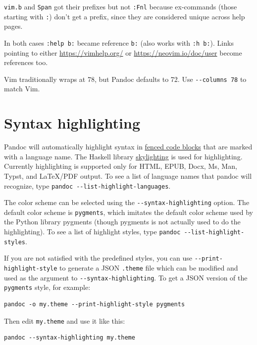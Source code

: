 \documentclass[
]{article}
\begin{document}
\texttt{vim.b} and \texttt{Span} got their prefixes but not
\texttt{:Fnl} because ex-commands (those starting with \texttt{:}) don't
get a prefix, since they are considered unique across help pages.

In both cases \texttt{:help\ b:} became reference
\texttt{\textbar{}b:\textbar{}} (also works with \texttt{:h\ b:}). Links
pointing to either \url{https://vimhelp.org/} or
\url{https://neovim.io/doc/user} become references too.

Vim traditionally wraps at 78, but Pandoc defaults to 72. Use
\texttt{-\/-columns\ 78} to match Vim.

\hypertarget{syntax-highlighting}{%
\section{Syntax highlighting}\label{syntax-highlighting}}

Pandoc will automatically highlight syntax in
\protect\hyperlink{fenced-code-blocks}{fenced code blocks} that are
marked with a language name. The Haskell library
\href{https://github.com/jgm/skylighting}{skylighting} is used for
highlighting. Currently highlighting is supported only for HTML, EPUB,
Docx, Ms, Man, Typst, and LaTeX/PDF output. To see a list of language
names that pandoc will recognize, type
\texttt{pandoc\ -\/-list-highlight-languages}.

The color scheme can be selected using the
\texttt{-\/-syntax-highlighting} option. The default color scheme is
\texttt{pygments}, which imitates the default color scheme used by the
Python library pygments (though pygments is not actually used to do the
highlighting). To see a list of highlight styles, type
\texttt{pandoc\ -\/-list-highlight-styles}.

If you are not satisfied with the predefined styles, you can use
\texttt{-\/-print-highlight-style} to generate a JSON \texttt{.theme}
file which can be modified and used as the argument to
\texttt{-\/-syntax-highlighting}. To get a JSON version of the
\texttt{pygments} style, for example:

\begin{verbatim}
pandoc -o my.theme --print-highlight-style pygments
\end{verbatim}

Then edit \texttt{my.theme} and use it like this:

\begin{verbatim}
pandoc --syntax-highlighting my.theme
\end{verbatim}
\end{document}
